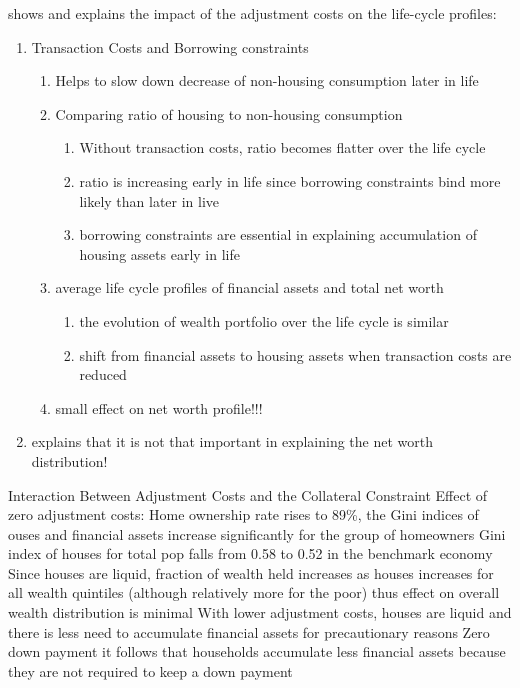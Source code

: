 \documentclass[a4paper,12pt]{article}
\begin{document}
\cite{yang2009} shows and explains the impact of the adjustment costs on the life-cycle profiles: 
\begin{enumerate}
\item Transaction Costs and Borrowing constraints
\begin{enumerate}
\item Helps to slow down decrease of non-housing consumption later in life
\item Comparing ratio of housing to non-housing consumption
\begin{enumerate}
\item Without transaction costs, ratio becomes flatter over the life cycle 
\item ratio is increasing early in life since borrowing constraints bind more likely than later in live
\item borrowing constraints are essential in explaining accumulation of housing assets early in life
\end{enumerate}
\item average life cycle profiles of financial assets and total net worth
\begin{enumerate}
\item the evolution of wealth portfolio over the life cycle is similar
\item shift from financial assets to housing assets when transaction costs are reduced 
\end{enumerate}
\item small effect on net worth profile!!!
\end{enumerate}
\item explains that it is not that important in explaining the net worth distribution! 
\end{enumerate}


\cite{diaz2010}
Interaction Between Adjustment Costs and the Collateral Constraint
Effect of zero adjustment costs:
Home ownership rate rises to 89\%, the Gini indices of ouses and financial assets increase significantly for the group of homeowners
Gini index of houses for total pop falls from 0.58 to 0.52 in the benchmark economy
Since houses are liquid, fraction of wealth held increases as houses increases for all wealth quintiles (although relatively more for the poor)  thus effect on overall wealth distribution is minimal 
With lower adjustment costs, houses are liquid and there is less need to accumulate financial assets for precautionary reasons
Zero down payment it follows that households accumulate less financial assets because they are not required to keep a down payment 
\end{document}
